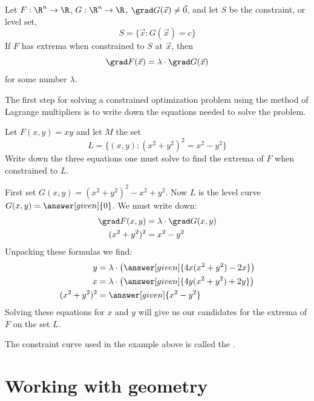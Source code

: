 \documentclass{ximera}
\begin{document}
\begin{theorem}
  Let $F:\R^n\to\R$, $G:\R^n\to\R$, $\grad G(\vec{x}) \ne \vec{0}$,
  and let $S$ be the constraint, or level set,
  \[
  S = \{\vec{x}: G(\vec{x}) = c\}
  \]
  If $F$ has extrema when constrained to $S$ at $\vec{x}$, then
  \[
  \grad F(\vec{x}) = \lambda \cdot \grad G(\vec{x})
  \]
  for some number $\lambda$.
\end{theorem}

The first step for solving a constrained optimization problem using
the method of Lagrange multipliers is to write down the equations
needed to solve the problem.

\begin{example}
  Let $F(x,y) = xy$ and let $M$ the set
  \[
  L = \{(x,y):(x^2+y^2)^2 = x^2-y^2\}
  \]
  Write down the three equations one must solve to find the extrema of
  $F$ when constrained to $L$.
  \begin{explanation}
    First set $G(x,y)= (x^2+y^2)^2 - x^2 +y^2$. Now $L$ is the level
    curve $G(x,y) =\answer[given]{0}$.  We must write down:
    \begin{align*}
      \grad F(x,y) &= \lambda \cdot \grad G(x,y)\\
      (x^2+y^2)^2 &= x^2-y^2
    \end{align*}
    Unpacking these formulas we find:
    \begin{align*}
      y &= \lambda \cdot \left(\answer[given]{4x(x^2+y^2)-2x}\right)\\
      x &= \lambda \cdot \left(\answer[given]{4y(x^2+y^2)+2y}\right)\\
      (x^2+y^2)^2 &= \answer[given]{x^2-y^2}
    \end{align*}
    Solving these equations for $x$ and $y$ will give us our
    candidates for the extrema of $F$ on the set $L$.
  \end{explanation}
\end{example}

\begin{remark}
  The constraint curve used in the example above is called the .
\end{remark}

  


\section{Working with geometry}
\end{document}
